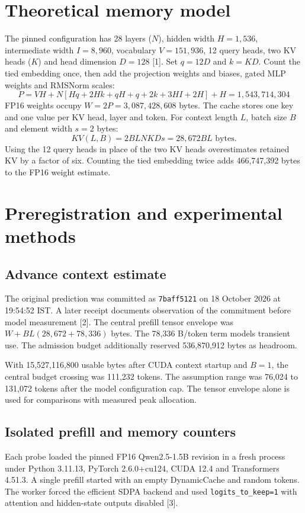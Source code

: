 \documentclass[11pt,a4paper]{article}
\begin{document}
\section{Theoretical memory model}
The pinned configuration has 28 layers ($N$), hidden width $H = 1{,}536$, intermediate width $I = 8{,}960$, vocabulary $V = 151{,}936$, 12 query heads, two KV heads ($K$) and head dimension $D = 128$ [1]. Set $q = 12D$ and $k = KD$. Count the tied embedding once, then add the projection weights and biases, gated MLP weights and RMSNorm scales:
\begin{equation}
P = VH + N[Hq + 2Hk + qH + q + 2k + 3HI + 2H] + H = 1{,}543{,}714{,}304
\end{equation}
FP16 weights occupy $W = 2P = 3{,}087{,}428{,}608$ bytes. The cache stores one key and one value per KV head, layer and token. For context length $L$, batch size $B$ and element width $s = 2$ bytes:
\begin{equation}
KV(L, B) = 2BLNKDs = 28{,}672BL \text{ bytes.}
\end{equation}
Using the 12 query heads in place of the two KV heads overestimates retained KV by a factor of six. Counting the tied embedding twice adds 466,747,392 bytes to the FP16 weight estimate.

\section{Preregistration and experimental methods}

\subsection{Advance context estimate}
The original prediction was committed as \texttt{7baff5121} on 18 October 2026 at 19:54:52 IST. A later receipt documents observation of the commitment before model measurement [2]. The central prefill tensor envelope was $W + BL(28{,}672 + 78{,}336)$ bytes. The 78,336 B/token term models transient use. The admission budget additionally reserved 536,870,912 bytes as headroom.

With 15,527,116,800 usable bytes after CUDA context startup and $B = 1$, the central budget crossing was 111,232 tokens. The assumption range was 76,024 to 131,072 tokens after the model configuration cap. The tensor envelope alone is used for comparisons with measured peak allocation.

\subsection{Isolated prefill and memory counters}
Each probe loaded the pinned FP16 Qwen2.5-1.5B revision in a fresh process under Python 3.11.13, PyTorch 2.6.0+cu124, CUDA 12.4 and Transformers 4.51.3. A single prefill started with an empty DynamicCache and random tokens. The worker forced the efficient SDPA backend and used \texttt{logits\_to\_keep=1} with attention and hidden-state outputs disabled [3].
\end{document}
